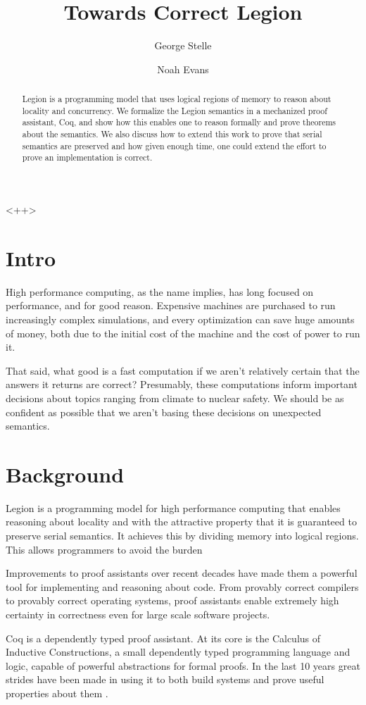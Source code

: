 \documentclass[sigconf]{acmart}
\author{George Stelle}
\affiliation{%
  \institution{Los Alamos National Laboratories}
}
\author{Noah Evans}
\affiliation{%
  \institution{Sandia National Laboratories}
  \streetaddress{P.O. Box 1212}
  \city{Dublin} 
  \state{Ohio} 
  \postcode{43017-6221}
}
\title{Towards Correct Legion}
\begin{document}
\maketitle{}<++>
\begin{abstract}
Legion is a programming model that uses logical regions of memory to reason about 
locality and concurrency. We formalize the Legion semantics in a mechanized
proof assistant, Coq, and show how this enables one to reason formally and
prove theorems about the semantics. We also discuss how to extend this work to
prove that serial semantics are preserved and how given enough time, one could
extend the effort to prove an implementation is correct.
\end{abstract}

\section{Intro}
High performance computing, as the name implies, has long focused on
performance, and for good reason. Expensive machines are purchased to run
increasingly complex simulations, and every optimization can save huge amounts
of money, both due to the initial cost of the machine and the cost of power to
run it. 

That said, what good is a fast computation if we aren't relatively certain that
the answers it returns are correct? Presumably, these computations inform
important decisions about topics ranging from climate to nuclear safety. We
should be as confident as possible that we aren't basing these decisions on
unexpected semantics.

\section{Background}

Legion is a programming model for high performance computing that enables
reasoning about locality and with the attractive property that it is guaranteed
to preserve serial semantics. It achieves this by dividing memory into logical
regions.  This allows programmers to avoid the
burden 

Improvements to proof assistants over recent decades have made them a powerful
tool for implementing and reasoning about code. From provably correct compilers
to provably correct operating systems, proof assistants enable extremely high
certainty in correctness even for large scale software projects. 

Coq is a dependently typed proof assistant. At its core is the Calculus of
Inductive Constructions, a small dependently typed programming language and
logic, capable of powerful abstractions for formal proofs. In the last 10 years 
great strides have been made in using it to both build systems and prove useful
properties about them \cite{compcert, certicoq, chlipala...}. 
\end{document}
